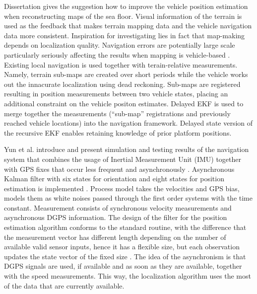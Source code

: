 Dissertation \cite{roman05} gives the suggestion how to improve the vehicle position estimation when reconstructing maps of the sea floor. Visual information of the terrain is used as the feedback that makes terrain mapping data and the vehicle navigation data more consistent. Inspiration for investigating lies in fact that map-making depends on localization quality. Navigation errors are potentially large scale particularly seriously affecting the results when mapping is vehicle-based \cite{roman05}. Existing local navigation is used together with terain-relative measurements. Namely, terrain sub-maps are created over short periods while the vehicle works out the innacurate localization using dead reckoning. Sub-maps are registered resulting in position measurements between two vehicle states, placing an additional constraint on the vehicle positon estimates. Delayed EKF is used to merge together the measurements (``sub-map'' registrations and previously reached vehicle locations) into the navigation framework. Delayed state version of the recursive EKF enables retaining knowledge of prior platform positions.  


Yun et al. introduce and present simulation and testing results of the navigation system that combines the usage of Inertial Measurement Unit (IMU) together with GPS fixes that occur less frequent and asynchronously \cite{yun00}. Asynchronous Kalman filter with six states for orientation and eight states for position estimation is implemented \cite{yun00}. Process model takes the velocities and GPS bias, models them as white noises passed through the first order systems with the time constant. Measurement consists of synchronous velocity measurements and asynchronous DGPS information. The design of the filter for the position estimation algorithm conforms to the standard routine, with the difference that the measurement vector has different length depending on the number of available valid sensor inputs, hence it has a flexible size, but each observation updates the state vector of the fixed size \cite{yun00}. The idea of the asynchronism is that DGPS signals are used, if available and as soon as they are available, together with the speed measurements. This way, the localization algorithm uses the most of the data that are currently available.  

